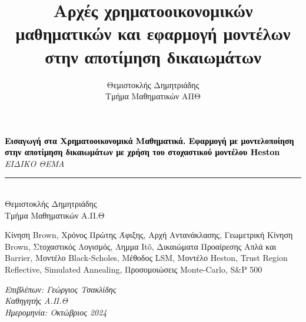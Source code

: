 \documentclass[12pt,a4paper,twoside,openany]{book}
\author{Θεμιστοκλής Δημητριάδης\\Τμήμα Μαθηματικών ΑΠΘ}
\title{Αρχές χρηματοοικονομικών μαθηματικών και εφαρμογή μοντέλων στην αποτίμηση δικαιωμάτων}
\date{}
\begin{document}
\begin{titlepage}
	\centering
	\vspace*{2cm}  %
	{\Huge\textbf{\textcolor{black}{Εισαγωγή στα Χρηματοοικονομικά Μαθηματικά. Εφαρμογή με μοντελοποίηση στην αποτίμηση δικαιωμάτων με χρήση του στοχαστικού μοντέλου Heston}}} \\[1cm]
	{\Huge\textit{ΕΙΔΙΚΟ ΘΕΜΑ}} \\[0.5cm]
	\rule{16cm}{1mm} \\[0.4cm]  %
	{\LARGE Θεμιστοκλής Δημητριάδης \\ Τμήμα Μαθηματικών Α.Π.Θ} \\[1.5cm]
	
	\begin{tcolorbox}[colback=gray!20, colframe=gray!80, width=0.6\textwidth, center title, title=\selectlanguage{english}Keywords]
		Κίνηση Brown, Χρόνος Πρώτης Άφιξης, Αρχή Αντανάκλασης, Γεωμετρική Κίνηση Brown, Στοχαστικός Λογισμός, Λημμα Itô, Δικαιώματα Προαίρεσης Απλά και Barrier, Μοντέλο Black-Scholes, Μέθοδος LSM, Μοντέλο Heston, Trust Region Reflective, Simulated Annealing, Προσομοιώσεις Monte-Carlo, S\&P 500
	\end{tcolorbox}
	
	\vfill
	{\Large \textit{Επιβλέπων: Γεώργιος Τσακλίδης\\Καθηγητής Α.Π.Θ}} \\[1cm]
	{\large \textit{Ημερομηνία: Οκτώβριος 2024}} %
\end{titlepage}

\tableofcontents %

\end{document}

